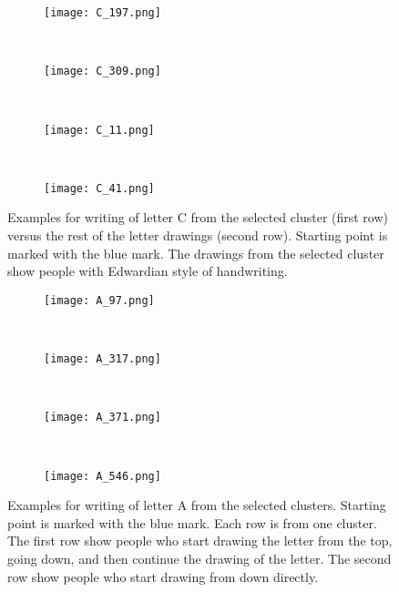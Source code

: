 \documentclass[conference]{IEEEtran}
\begin{document}
\begin{figure}[!htbp]
    \centering
    \begin{subfigure}{0.22\textwidth}
        \texttt{[image: C\_197.png]}
    \end{subfigure}
    ~
    \begin{subfigure}{0.22\textwidth}
        \texttt{[image: C\_309.png]}
    \end{subfigure}
    ~
    \begin{subfigure}{0.22\textwidth}
        \texttt{[image: C\_11.png]}
    \end{subfigure}
    ~
    \begin{subfigure}{0.22\textwidth}
        \texttt{[image: C\_41.png]}
    \end{subfigure}
    
    \caption{Examples for writing of letter C from the selected cluster (first row) versus the rest of the letter drawings (second row). Starting point is marked with the blue mark. The drawings from the selected cluster show people with Edwardian style of handwriting.}
    \label{fig:examples_c}
\end{figure}

\begin{figure}[!htbp]
    \centering
    \begin{subfigure}{0.22\textwidth}
        \texttt{[image: A\_97.png]}
    \end{subfigure}
    ~
    \begin{subfigure}{0.22\textwidth}
        \texttt{[image: A\_317.png]}
    \end{subfigure}
    ~
    \begin{subfigure}{0.22\textwidth}
        \texttt{[image: A\_371.png]}
    \end{subfigure}
    ~
    \begin{subfigure}{0.22\textwidth}
        \texttt{[image: A\_546.png]}
    \end{subfigure}
    
    \caption{Examples for writing of letter A from the selected clusters. Starting point is marked with the blue mark. Each row is from one cluster. The first row show people who start drawing the letter from the top, going down, and then continue the drawing of the letter. The second row show people who start drawing from down directly. }
    \label{fig:examples_a}
\end{figure}
\end{document}
